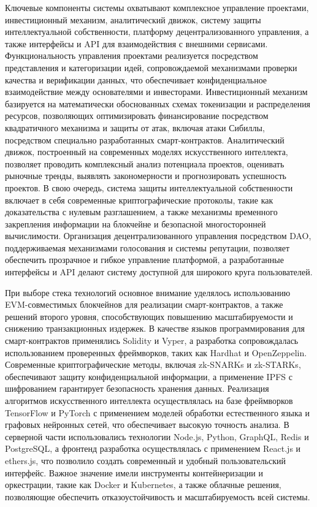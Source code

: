 \documentclass[
    14pt,
    specialist,
    candidate, %
    subf, %
    href,
    dotsinheaders=false
]{disser}
\begin{document}
Ключевые компоненты системы охватывают комплексное управление проектами, инвестиционный механизм, аналитический движок, систему защиты интеллектуальной собственности, платформу децентрализованного управления, а также интерфейсы и API для взаимодействия с внешними сервисами. Функциональность управления проектами реализуется посредством представления и категоризации идей, сопровождаемой механизмами проверки качества и верификации данных, что обеспечивает конфиденциальное взаимодействие между основателями и инвесторами. Инвестиционный механизм базируется на математически обоснованных схемах токенизации и распределения ресурсов, позволяющих оптимизировать финансирование посредством квадратичного механизма и защиты от атак, включая атаки Сибиллы, посредством специально разработанных смарт-контрактов. Аналитический движок, построенный на современных моделях искусственного интеллекта, позволяет проводить комплексный анализ потенциала проектов, оценивать рыночные тренды, выявлять закономерности и прогнозировать успешность проектов. В свою очередь, система защиты интеллектуальной собственности включает в себя современные криптографические протоколы, такие как доказательства с нулевым разглашением, а также механизмы временного закрепления информации на блокчейне и безопасной многосторонней вычислимости. Организация децентрализованного управления посредством DAO, поддерживаемая механизмами голосования и системы репутации, позволяет обеспечить прозрачное и гибкое управление платформой, а разработанные интерфейсы и API делают систему доступной для широкого круга пользователей.

При выборе стека технологий основное внимание уделялось использованию EVM-совместимых блокчейнов для реализации смарт-контрактов, а также решений второго уровня, способствующих повышению масштабируемости и снижению транзакционных издержек. В качестве языков программирования для смарт-контрактов применялись Solidity и Vyper, а разработка сопровождалась использованием проверенных фреймворков, таких как Hardhat и OpenZeppelin. Современные криптографические методы, включая zk-SNARKs и zk-STARKs, обеспечивают защиту конфиденциальной информации, а применение IPFS с шифрованием гарантирует безопасность хранения данных. Реализация алгоритмов искусственного интеллекта осуществлялась на базе фреймворков TensorFlow и PyTorch с применением моделей обработки естественного языка и графовых нейронных сетей, что обеспечивает высокую точность анализа. В серверной части использовались технологии Node.js, Python, GraphQL, Redis и PostgreSQL, а фронтенд разработка осуществлялась с применением React.js и ethers.js, что позволило создать современный и удобный пользовательский интерфейс. Важное значение имели инструменты контейнеризации и оркестрации, такие как Docker и Kubernetes, а также облачные решения, позволяющие обеспечить отказоустойчивость и масштабируемость всей системы.
\end{document}
